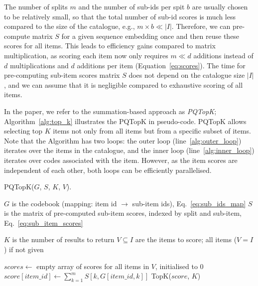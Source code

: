 \documentclass[sigconf,natbib=true, review=true]{acmart} %
\newcommand{\pageenlarge}[1]{\marginnote{}\enlargethispage{#1\baselineskip}}
\newcommand{\sasha}[1]{\textcolor[HTML]{000000}{#1}}
\newcommand{\rsasha}[1]{\textcolor[HTML]{FF0000}{#1}}
\begin{document}
The number of splits $m$ and the number of sub-ids per spit $b$ are usually  chosen to be relatively small, 
so that the total number of sub-id scores is much less compared to the size of the catalogue, e.g., $m\times b \ll |I|$. 
%
Therefore,  we can pre-compute matrix $S$ \sasha{for a given sequence embedding} once and then reuse these scores for all items. This leads to efficiency gains compared to matrix multiplication, as scoring each item now only requires $m \ll d$ additions instead of $d$ multiplications and $d$ additions per item (Equation~\eqref{eq:scores}). The time for pre-computing sub-item scores matrix $S$ does not depend on the catalogue size $|I|$, and %
we can assume that it is negligible compared to exhaustive scoring of all items. 

In the paper, we refer to the summation-based approach as \textit{PQTopK}; Algorithm~\ref{alg:top_k} illustrates the PQTopK in pseudo-code. \rsasha{PQTopK} allows selecting top $K$ items not only from all items but from a specific subset of items. Note that the Algorithm has two loops: the outer loop (line~\ref{alg:outer_loop}) iterates over the items in the catalogue, and the inner loop (line~\ref{alg:inner_loop}) iterates over codes associated with the item. However, as the item scores are independent of each other, both loops can be efficiently parallelised. 



\begin{algorithm}[h]
\small
\caption{PQTopK($G$, $S$, $K$, $V$).}\label{alg:top_k}
\begin{algorithmic}[1]
   \Require $G$ is the codebook (mapping: item id $\rightarrow$ sub-item ids), Eq.~\eqref{eq:sub_ids_map}
   \Require $S$ is the matrix of pre-computed sub-item scores, indexed by split and sub-item, Eq.~\eqref{eq:sub_item_scores}

   \Require $K$ is the number of results to return
   \Require $V \subseteq I$ are the items to score; all items ($V = I$)  if not given 
   
   \State $scores \gets$ empty array of scores for all items in $V$, initialised to 0
    \label{alg:outer_loop} 
        \State $score[item\_id] \gets \sum_{k=1}^{m} S[k,G[item\_id,k]] \label{alg:inner_loop} $ 
   \EndFor
   \State \Return TopK($score$, $K$)  
\end{algorithmic}
\end{algorithm}
\end{document}
